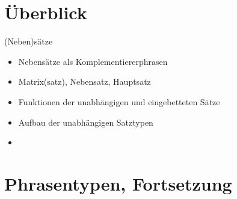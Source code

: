 % 
% 

\section{Überblick}

\begin{frame}
  {(Neben)sätze}
  \pause
  \begin{itemize}[<+->]
    \item Nebensätze als Komplementiererphrasen
    \Halbzeile
    \item Matrix(satz), Nebensatz, Hauptsatz
    \item Funktionen der unabhängigen und eingebetteten Sätze 
    \item Aufbau der unabhängigen Satztypen
    \Halbzeile
    \item {}
  \end{itemize}

\end{frame}


\section{Phrasentypen, Fortsetzung}

